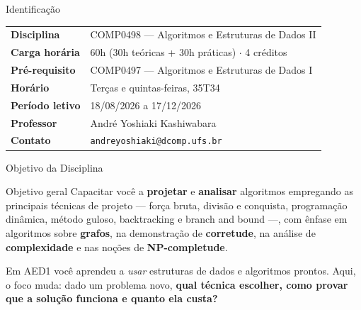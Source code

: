 \documentclass[aspectratio=169]{beamer}
\begin{document}
\begin{frame}{Identificação}
  \begin{center}
  \renewcommand{\arraystretch}{1.4}
  \begin{tabular}{>{\bfseries}l l}
    \toprule
    Disciplina & COMP0498 --- Algoritmos e Estruturas de Dados II \\
    Carga horária & 60h (30h teóricas + 30h práticas) $\cdot$ 4 créditos \\
    Pré-requisito & COMP0497 --- Algoritmos e Estruturas de Dados I \\
    Horário & Terças e quintas-feiras, 35T34 \\
    Período letivo & 18/08/2026 a 17/12/2026 \\
    Professor & André Yoshiaki Kashiwabara \\
    Contato & \texttt{andreyoshiaki@dcomp.ufs.br} \\
    \bottomrule
  \end{tabular}
  \end{center}
\end{frame}

\begin{frame}{Objetivo da Disciplina}
  \begin{block}{Objetivo geral}
    Capacitar você a \textbf{projetar} e \textbf{analisar} algoritmos empregando as
    principais técnicas de projeto --- força bruta, divisão e conquista, programação
    dinâmica, método guloso, backtracking e branch and bound ---, com ênfase em
    algoritmos sobre \textbf{grafos}, na demonstração de \textbf{corretude}, na análise de
    \textbf{complexidade} e nas noções de \textbf{NP-completude}.
  \end{block}

  \vspace{0.4cm}
  Em AED1 você aprendeu a \emph{usar} estruturas de dados e algoritmos prontos.
  Aqui, o foco muda: dado um problema novo, \textbf{qual técnica escolher, como
  provar que a solução funciona e quanto ela custa?}
\end{frame}
\end{document}
